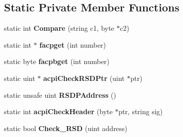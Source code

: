 \subsection*{Static Private Member Functions}
\begin{DoxyCompactItemize}
\item 
\mbox{\label{class_medli_1_1_hardware_1_1_a_c_p_i_a90d1ff2d0ddc6664eda4fa1afb6a7868}} 
static int {\bfseries Compare} (string c1, byte $\ast$c2)
\item 
\mbox{\label{class_medli_1_1_hardware_1_1_a_c_p_i_ae626ea548fea35fc19dc9e95cd1b84b7}} 
static int $\ast$ {\bfseries facpget} (int number)
\item 
\mbox{\label{class_medli_1_1_hardware_1_1_a_c_p_i_a30556337039f6908dfd7b1bcdfed1cf7}} 
static byte {\bfseries facpbget} (int number)
\item 
\mbox{\label{class_medli_1_1_hardware_1_1_a_c_p_i_a9d277d9a5be3853f271db5d99ad58b12}} 
static uint $\ast$ {\bfseries acpi\+Check\+R\+S\+D\+Ptr} (uint $\ast$ptr)
\item 
\mbox{\label{class_medli_1_1_hardware_1_1_a_c_p_i_af9d88efe6417e593b8d1863a56932095}} 
static unsafe uint {\bfseries R\+S\+D\+P\+Address} ()
\item 
\mbox{\label{class_medli_1_1_hardware_1_1_a_c_p_i_a1f8a16f0f5797e5dca35dec07de7c4cd}} 
static int {\bfseries acpi\+Check\+Header} (byte $\ast$ptr, string sig)
\item 
\mbox{\label{class_medli_1_1_hardware_1_1_a_c_p_i_aa125d05f82cd4397ab41e20dd8a391c9}} 
static bool {\bfseries Check\+\_\+\+R\+SD} (uint address)
\end{DoxyCompactItemize}
